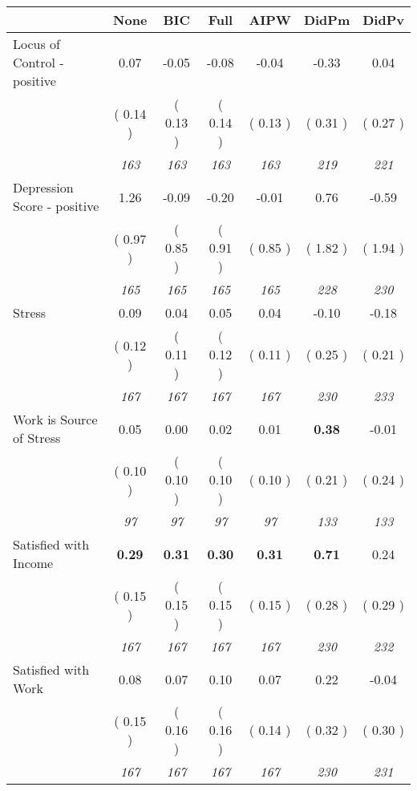 \begin{tabular}{l c c c c c c}
\toprule
 & None & BIC & Full & AIPW & DidPm & DidPv \\
\midrule
Locus of Control - positive &      0.07 &     -0.05 &     -0.08 &     -0.04 &     -0.33 &      0.04 \\
& (     0.14 ) & (     0.13 ) & (     0.14 ) & (     0.13 ) & (     0.31 ) & (     0.27 ) \\
& \textit{ 163 } & \textit{ 163 } & \textit{ 163 } & \textit{ 163 } & \textit{ 219 } & \textit{ 221 } \\
Depression Score - positive &      1.26 &     -0.09 &     -0.20 &     -0.01 &      0.76 &     -0.59 \\
& (     0.97 ) & (     0.85 ) & (     0.91 ) & (     0.85 ) & (     1.82 ) & (     1.94 ) \\
& \textit{ 165 } & \textit{ 165 } & \textit{ 165 } & \textit{ 165 } & \textit{ 228 } & \textit{ 230 } \\
Stress &      0.09 &      0.04 &      0.05 &      0.04 &     -0.10 &     -0.18 \\
& (     0.12 ) & (     0.11 ) & (     0.12 ) & (     0.11 ) & (     0.25 ) & (     0.21 ) \\
& \textit{ 167 } & \textit{ 167 } & \textit{ 167 } & \textit{ 167 } & \textit{ 230 } & \textit{ 233 } \\
Work is Source of Stress &      0.05 &      0.00 &      0.02 &      0.01 & \textbf{      0.38 } &     -0.01 \\
& (     0.10 ) & (     0.10 ) & (     0.10 ) & (     0.10 ) & (     0.21 ) & (     0.24 ) \\
& \textit{ 97 } & \textit{ 97 } & \textit{ 97 } & \textit{ 97 } & \textit{ 133 } & \textit{ 133 } \\
Satisfied with Income & \textbf{      0.29 } & \textbf{      0.31 } & \textbf{      0.30 } & \textbf{     0.31} & \textbf{      0.71 } &      0.24 \\
& (     0.15 ) & (     0.15 ) & (     0.15 ) & (     0.15 ) & (     0.28 ) & (     0.29 ) \\
& \textit{ 167 } & \textit{ 167 } & \textit{ 167 } & \textit{ 167 } & \textit{ 230 } & \textit{ 232 } \\
Satisfied with Work &      0.08 &      0.07 &      0.10 &      0.07 &      0.22 &     -0.04 \\
& (     0.15 ) & (     0.16 ) & (     0.16 ) & (     0.14 ) & (     0.32 ) & (     0.30 ) \\
& \textit{ 167 } & \textit{ 167 } & \textit{ 167 } & \textit{ 167 } & \textit{ 230 } & \textit{ 231 } \\

\end{tabular}
